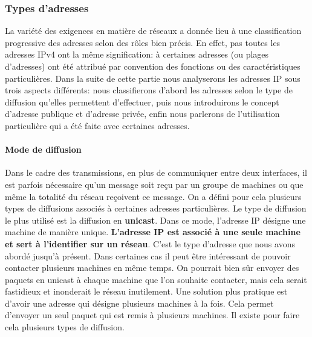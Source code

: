 \subsubsection{Types d'adresses}
La variété des exigences en matière de réseaux a donnée lieu à une
classification progressive des adresses selon des rôles bien précis. En effet,
pas toutes les adresses IPv4 ont la même signification: à certaines adresses
(ou plages d'adresses) ont été attribué par convention des fonctions ou des
caractéristiques particulières.  Dans la suite de cette partie nous analyserons les
adresses IP sous trois aspects différents: nous classifierons d'abord les adresses selon
le type de diffusion qu'elles permettent d'effectuer, puis nous introduirons le
concept d'adresse publique et d'adresse privée, enfin nous parlerons de l'utilisation
particulière qui a été faite avec certaines adresses.



\paragraph{Mode de diffusion}
Dans le cadre des transmissions, en plus de communiquer entre deux interfaces,
il est parfois nécessaire qu'un message soit reçu par un groupe de machines ou
que même la totalité du réseau reçoivent ce message.  On a défini pour cela
plusieurs types de diffusions associés à certaines adresses particulières.
Le type de diffusion le plus utilisé est la diffusion en \textbf{unicast}. Dans ce mode,
l'adresse IP désigne une machine de manière unique. \textbf{L'adresse IP est
associé à une seule machine et sert à l'identifier sur un réseau}.  C'est le
type d'adresse que nous avons abordé jusqu'à présent. 
Dans certaines cas il peut être
intéressant de pouvoir contacter plusieurs machines en même temps. On pourrait bien sûr
envoyer des paquets en unicast à chaque machine que l'on souhaite contacter,
mais cela serait fastidieux et inonderait le réseau inutilement. Une solution plus
pratique est d'avoir une adresse qui désigne plusieurs machines à la fois. Cela
permet d'envoyer un seul paquet qui est remis à plusieurs machines. Il
existe pour faire cela plusieurs types de diffusion.

